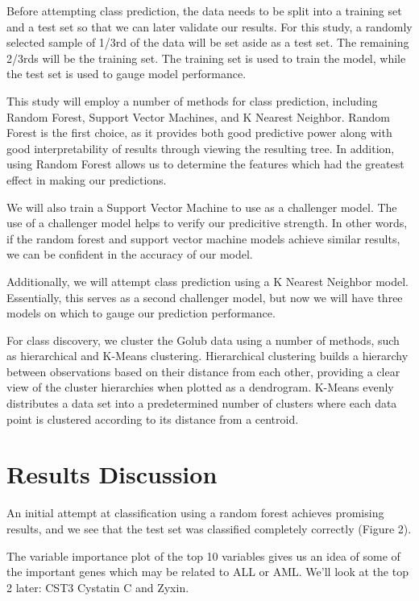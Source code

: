 \documentclass[]{article}
\begin{document}
Before attempting class prediction, the data needs to be split into a
training set and a test set so that we can later validate our results.
For this study, a randomly selected sample of 1/3rd of the data will be
set aside as a test set. The remaining 2/3rds will be the training set.
The training set is used to train the model, while the test set is used
to gauge model performance.

This study will employ a number of methods for class prediction,
including Random Forest, Support Vector Machines, and K Nearest
Neighbor. Random Forest is the first choice, as it provides both good
predictive power along with good interpretability of results through
viewing the resulting tree. In addition, using Random Forest allows us
to determine the features which had the greatest effect in making our
predictions.

We will also train a Support Vector Machine to use as a challenger
model. The use of a challenger model helps to verify our predicitive
strength. In other words, if the random forest and support vector
machine models achieve similar results, we can be confident in the
accuracy of our model.

Additionally, we will attempt class prediction using a K Nearest
Neighbor model. Essentially, this serves as a second challenger model,
but now we will have three models on which to gauge our prediction
performance.

For class discovery, we cluster the Golub data using a number of
methods, such as hierarchical and K-Means clustering. Hierarchical
clustering builds a hierarchy between observations based on their
distance from each other, providing a clear view of the cluster
hierarchies when plotted as a dendrogram. K-Means evenly distributes a
data set into a predetermined number of clusters where each data point
is clustered according to its distance from a centroid.

\section{Results Discussion}\label{results-discussion}

An initial attempt at classification using a random forest achieves
promising results, and we see that the test set was classified
completely correctly (Figure 2).

The variable importance plot of the top 10 variables gives us an idea of
some of the important genes which may be related to ALL or AML. We'll
look at the top 2 later: CST3 Cystatin C and Zyxin.
\end{document}
